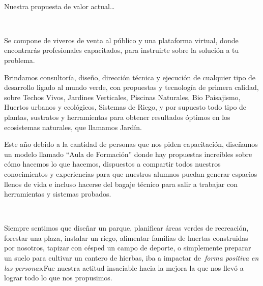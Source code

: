 ~

Nuestra propuesta de valor actual\ldots{}

~

Se compone de viveros de venta al público y una plataforma virtual,
donde encontrarás profesionales capacitados, para instruirte sobre la
solución a tu problema.

Brindamos consultoría, diseño, dirección técnica y ejecución de
cualquier tipo de desarrollo ligado al mundo verde, con propuestas y
tecnología de primera calidad, sobre Techos Vivos, Jardines Verticales,
Piscinas Naturales, Bio Paisajismo, Huertos urbanos y ecológicos,
Sistemas de Riego, y por supuesto todo tipo de plantas, sustratos y
herramientas para obtener resultados óptimos en los ecosistemas
naturales, que llamamos Jardín.

Este año debido a la cantidad de personas que nos piden capacitación,
diseñamos un modelo llamado ``Aula de Formación'' donde hay propuestas
increíbles sobre cómo hacemos lo que hacemos, dispuestos a compartir
todos nuestros conocimientos y experiencias para que nuestros alumnos
puedan generar espacios llenos de vida e incluso hacerse del bagaje
técnico para salir a trabajar con herramientas y sistemas probados.

~

Siempre sentimos que diseñar un parque, planificar áreas verdes de
recreación, forestar una plaza, instalar un riego, alimentar familias de
huertas construidas por nosotros, tapizar con césped un campo de
deporte, o simplemente preparar un suelo para cultivar un cantero de
hierbas, iba a impactar de~\emph{forma positiva en las personas}.Fue
nuestra actitud insaciable hacia la mejora la que nos llevó a lograr
todo lo que nos propusimos.

~